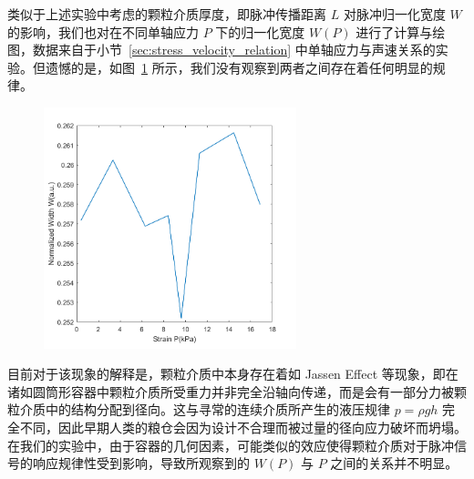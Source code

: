 类似于上述实验中考虑的颗粒介质厚度，即脉冲传播距离 $L$ 对脉冲归一化宽度 $W$ 的影响，我们也对在不同单轴应力 $P$ 下的归一化宽度 $W(P)$ 进行了计算与绘图，数据来自于小节~\ref{sec:stress_velocity_relation} 中单轴应力与声速关系的实验。但遗憾的是，如图~\ref{fig:normalized_width_versus_P} 所示，我们没有观察到两者之间存在着任何明显的规律。

\begin{figure}[!hbtp]
  \centering
  \includegraphics[height=7cm]{figures/2_W_norm&Strain.png}
  \label{fig:normalized_width_versus_P}
\end{figure}

目前对于该现象的解释是，颗粒介质中本身存在着如 Jassen Effect 等现象，即在诸如圆筒形容器中颗粒介质所受重力并非完全沿轴向传递，而是会有一部分力被颗粒介质中的结构分配到径向。这与寻常的连续介质所产生的液压规律 $p=\rho gh$ 完全不同，因此早期人类的粮仓会因为设计不合理而被过量的径向应力破坏而坍塌\cite{sperlExperimentsCornPressure2006}。在我们的实验中，由于容器的几何因素，可能类似的效应使得颗粒介质对于脉冲信号的响应规律性受到影响，导致所观察到的 $W(P)$ 与 $P$ 之间的关系并不明显。